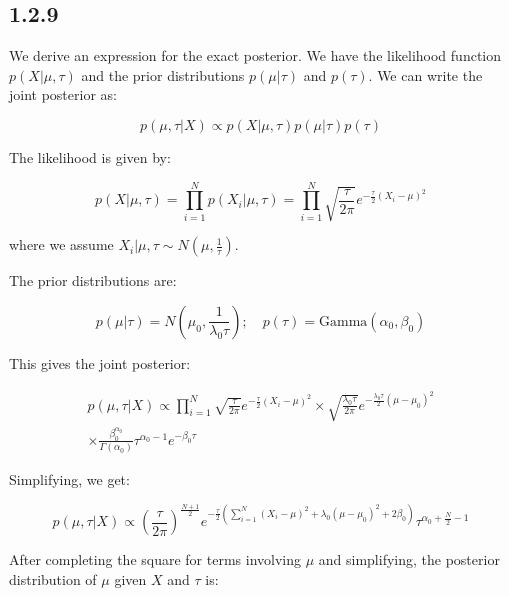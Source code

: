 \documentclass{article}
\begin{document}
\begin{multicols}{2}
    \subsection*{1.2.9}

    We derive an expression for the exact posterior. We have the likelihood function $p(X|\mu, \tau)$ and the prior distributions $p(\mu|\tau)$ and $p(\tau)$. We can write the joint posterior as:

    \begin{equation}
        p(\mu, \tau | X) \propto p(X | \mu, \tau) p(\mu | \tau) p(\tau)
    \end{equation}


    The likelihood is given by:

    \begin{equation}
    p(X | \mu, \tau) = \prod_{i=1}^{N} p(X_i | \mu, \tau) = \prod_{i=1}^{N} \sqrt{\frac{\tau}{2 \pi}} e^{-\frac{\tau}{2} (X_i - \mu)^2}
    \end{equation}

    where we assume \( X_i | \mu, \tau \sim N(\mu, \frac{1}{\tau}) \).

    The prior distributions are:

    \begin{equation}
    p(\mu | \tau) = N(\mu_0, \frac{1}{\lambda_0 \tau}); \quad p(\tau) = \mathrm{Gamma}(\alpha_0, \beta_0)
    \end{equation}


    This gives the joint posterior:

    \begin{multline}
    p(\mu, \tau | X) \propto \prod_{i=1}^{N} \sqrt{\frac{\tau}{2 \pi}} e^{-\frac{\tau}{2} (X_i - \mu)^2} \times \sqrt{\frac{\lambda_0 \tau}{2 \pi}} e^{-\frac{\lambda_0 \tau}{2} (\mu - \mu_0)^2}\\ \times \frac{\beta_0^{\alpha_0}}{\Gamma(\alpha_0)} \tau^{\alpha_0 - 1} e^{-\beta_0 \tau}
    \end{multline}

    Simplifying, we get:

    \begin{equation}
    p(\mu, \tau | X) \propto \left(\frac{\tau}{2 \pi}\right)^{\frac{N+1}{2}} e^{-\frac{\tau}{2} \left(\sum_{i=1}^{N} (X_i - \mu)^2 + \lambda_0 (\mu - \mu_0)^2 + 2 \beta_0 \right)} \tau^{\alpha_0 + \frac{N}{2} - 1}
    \end{equation}


    After completing the square for terms involving \( \mu \) and simplifying, the posterior distribution of \( \mu \) given \( X \) and \( \tau \) is:


\end{multicols}
\end{document}
